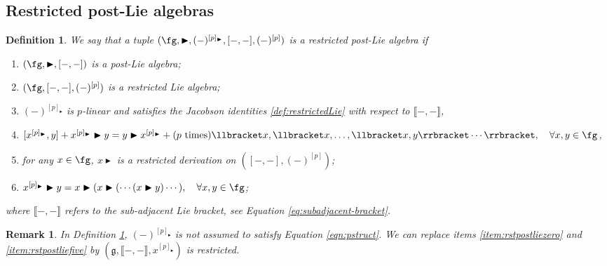 \documentclass[12pt]{article}
\newcommand{\btr}{\blacktriangleright}
\newtheorem{remark}[theorem]{Remark}
\newtheorem{definition}[theorem]{Definition}
\begin{document}
\subsection{Restricted post-Lie algebras}
\begin{definition}
\label{def:restrictedpostlie}
We say that a tuple $(\fg, \btr ,  (-)^{[p]_{\btr}} ,  [-,-], (-)^{[p]})$ is a \emph{restricted post-Lie algebra} if 
\begin{enumerate}

\item \label{item:rstpostlieone}$(\fg, \btr, [-,-])$ is a post-Lie algebra;

\item \label{item:rstpostlietwo}$(\fg, [-,-], (-)^{[p]})$ is a restricted Lie algebra;

\item \label{item:rstpostliezero}$(-)^{[p]_{\btr}}$ is $p$-linear and satisfies the Jacobson identities \eqref{def:restrictedLie} with respect to $\llbracket-,-\rrbracket$,

\item \label{item:rstpostliefive} $
[x^{[p]_{\btr}},y] + x^{[p]_{\btr}}\btr y  =  y \btr x^{[p]_{\btr}} + (p~{\rm times} )\llbracket x, \llbracket x, \ldots,\llbracket x,y \rrbracket \cdots \rrbracket, \quad \forall x,y \in \fg
$,
\item \label{item:rstpostliethree} for any $x\in\fg$, $x\btr$ is a restricted derivation on  $([-,-], (-)^{[p]})$;

\item \label{item:rstpostliefour}$ x^{[p]_{\btr}} \btr y= x \btr ( x \btr ( \cdots (x \btr y)\cdots ), \quad \forall x,y \in \fg $;


\end{enumerate}
where $\llbracket-,-\rrbracket$ refers to the sub-adjacent Lie bracket, see Equation \eqref{eq:subadjacent-bracket}.
\end{definition}
\begin{remark} In Definition \ref{def:restrictedpostlie}, $(-)^{[p]_{\btr}}$ is not assumed to satisfy Equation \eqref{eqn:pstruct}. We can replace items \ref{item:rstpostliezero} and \ref{item:rstpostliefive} by $(\mathfrak{g}, \llbracket -,- \rrbracket, x^{[p]_{\btr}})$ is restricted.
\end{remark}
\end{document}
